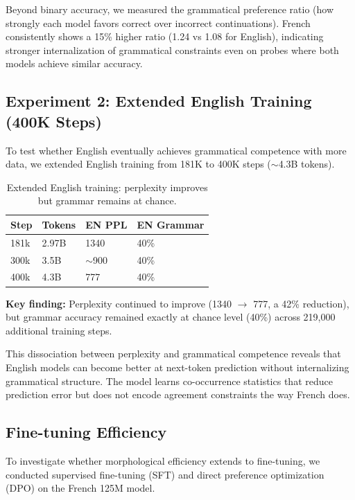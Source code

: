 \documentclass[11pt,a4paper]{article}
\begin{document}
Beyond binary accuracy, we measured the grammatical preference ratio (how strongly each model favors correct over incorrect continuations). French consistently shows a 15\% higher ratio (1.24 vs 1.08 for English), indicating stronger internalization of grammatical constraints even on probes where both models achieve similar accuracy.

\subsection{Experiment 2: Extended English Training (400K Steps)}

To test whether English eventually achieves grammatical competence with more data, we extended English training from 181K to 400K steps ($\sim$4.3B tokens).

\begin{table}[h]
\centering
\begin{tabular}{llll}
\toprule
Step & Tokens & EN PPL & EN Grammar \\
\midrule
181k & 2.97B & 1340 & 40\% \\
300k & 3.5B & $\sim$900 & 40\% \\
400k & 4.3B & 777 & 40\% \\
\bottomrule
\end{tabular}
\caption{Extended English training: perplexity improves but grammar remains at chance.}
\label{tab:extended-english}
\end{table}

\textbf{Key finding:} Perplexity continued to improve (1340 $\rightarrow$ 777, a 42\% reduction), but grammar accuracy remained exactly at chance level (40\%) across 219,000 additional training steps.

This dissociation between perplexity and grammatical competence reveals that English models can become better at next-token prediction without internalizing grammatical structure. The model learns co-occurrence statistics that reduce prediction error but does not encode agreement constraints the way French does.

\subsection{Fine-tuning Efficiency}

To investigate whether morphological efficiency extends to fine-tuning, we conducted supervised fine-tuning (SFT) and direct preference optimization (DPO) on the French 125M model.
\end{document}
